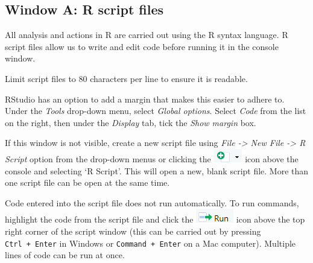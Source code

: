 \documentclass[
  letterpaper,
  DIV=11,
  numbers=noendperiod]{scrreprt}
\begin{document}
\subsection{Window A: R script files}\label{window-a-r-script-files}

All analysis and actions in R are carried out using the R syntax
language. R script files allow us to write and edit code before running
it in the console window.

\begin{tcolorbox}[enhanced jigsaw, bottomrule=.15mm, left=2mm, leftrule=.75mm, bottomtitle=1mm, coltitle=black, colbacktitle=quarto-callout-tip-color!10!white, toptitle=1mm, arc=.35mm, breakable, title=\textcolor{quarto-callout-tip-color}{\faLightbulb}\hspace{0.5em}{Style tip}, rightrule=.15mm, toprule=.15mm, opacityback=0, opacitybacktitle=0.6, titlerule=0mm, colback=white, colframe=quarto-callout-tip-color-frame]

Limit script files to 80 characters per line to ensure it is readable.

RStudio has an option to add a margin that makes this easier to adhere
to. Under the \emph{Tools} drop-down menu, select \emph{Global options}.
Select \emph{Code} from the list on the right, then under the
\emph{Display} tab, tick the \emph{Show margin} box.

\end{tcolorbox}

If this window is not visible, create a new script file using \emph{File
-\textgreater{} New File -\textgreater{} R Script} option from the
drop-down menus or clicking the \includegraphics{img/new_script.png}
icon above the console and selecting `R Script'. This will open a new,
blank script file. More than one script file can be open at the same
time.

Code entered into the script file does not run automatically. To run
commands, highlight the code from the script file and click the
\includegraphics{img/run_icon.png} icon above the top right corner of
the script window (this can be carried out by pressing
\texttt{Ctrl\ +\ Enter} in Windows or \texttt{Command\ +\ Enter} on a
Mac computer). Multiple lines of code can be run at once.
\end{document}
